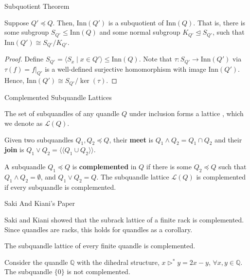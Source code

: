 \documentclass[10pt]{beamer}
\newcommand{\Q}{\mathbb{Q}}
\newcommand{\cL}{\mathcal{L}}
\newcommand{\gen}[1]{\langle#1\rangle} %
\newcommand{\normal}{\trianglelefteq} %
\newcommand{\qgen}[1]{\langle\langle#1\rangle\rangle}
\newcommand{\sq}{\preccurlyeq} %
\newcommand{\thru}{\rhd} %
\newcommand{\Inn}{\mathrm{Inn}} %
\theoremstyle{plain}
\begin{document}
\begin{frame}{Subquotient Theorem} %
    \begin{theorem}
    Suppose $Q'\sq Q$. Then, $\Inn(Q')$ is a subquotient of $\Inn(Q)$. That is, there is some subgroup $S_{Q'}\leq \Inn(Q)$ and some normal subgroup $K_{Q'}\normal S_{Q'}$, such that $\Inn(Q') \cong S_{Q'}/K_{Q'}$. 
    \end{theorem}
    \vspace{0.25in}
    \pause
    \begin{proof}
    Define $S_{Q'}=\gen{S_x \mid x \in Q'} \leq \Inn(Q).$ Note that $\tau:S_{Q'}\to \Inn(Q')$ via $\tau(f)=f|_{Q'}$ is a well-defined surjective homomorphism with image $\Inn(Q')$. Hence, $\Inn(Q')\cong S_{Q'}/\ker(\tau).$
    \end{proof}
\end{frame}

\begin{frame}{Complemented Subquandle Lattices}

\begin{definition}
The set of subquandles of any quandle $Q$ under inclusion forms a lattice \cite{SakiKiani2021}, which we denote as $\cL(Q)$. 
\end{definition}
\pause

\begin{definition}
Given two subquandles $Q_1, Q_2\sq Q$, their \textbf{meet} is $Q_1\wedge Q_2 = Q_1\cap Q_2$ and their \textbf{join} is $Q_1\vee Q_2 =  \qgen{Q_1\cup Q_2}$.
\end{definition}
\pause

\begin{definition}
A subquandle $Q_1\sq Q$ is \textbf{complemented} in $Q$ if there is some $Q_2\sq Q$ such that $Q_1 \wedge Q_2 = \emptyset$, and $Q_1\vee Q_2 = Q$. The subquandle lattice $\cL(Q)$ is complemented if every subquandle is complemented.
\end{definition}
\end{frame}


\begin{frame}{Saki And Kiani's Paper}

Saki and Kiani \cite{SakiKiani2021} showed that the subrack lattice of a finite rack is complemented. Since quandles are racks, this holds for quandles as a corollary.

\begin{corollary}
The subquandle lattice of every finite quandle is complemented.
\end{corollary}
\vspace{0.2in}
\pause

\begin{theorem}
Consider the quandle $\Q$ with the dihedral structure, $x\thru^* y = 2x-y$, $\forall x,y\in \Q$. The subquandle $\{0\}$ is not complemented.
\end{theorem}
\end{frame}
\end{document}

